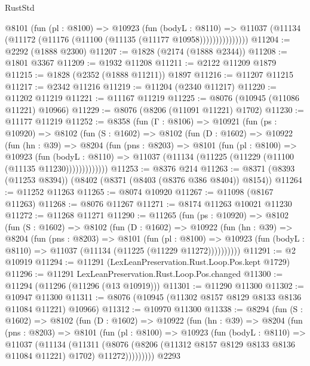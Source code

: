 \begin{lexlean}{RustStd}
\begin{coremodule}
                @8101
                  (fun (pl : @8100) =>
                  @10923
                    (fun (bodyL : @8110) =>
                    @11037 (@11134 (@11172 (@11176 (@11100 (@11135 (@11177 @10958)))))))))))))))
@11204 := @2292 (@1888 @2300)
@11207 := @1828 (@2174 (@1888 @2344))
@11208 := @1801 @3367
@11209 := @1932 @11208
@11211 := @2122 @11209 @1879
@11215 := @1828 (@2352 (@1888 @11211)) @1897
@11216 := @11207 @11215
@11217 := @2342 @11216
@11219 := @11204 (@2340 @11217)
@11220 := @11202 @11219
@11221 := @11167 @11219
@11225 := @8076 (@10945 (@11086 @11221) @10966)
@11229 := @8076 (@8206 (@11091 @11221) @1702)
@11230 := @11177 @11219
@11252 := @8358
    (fun (Γ : @8106) =>
    @10921
      (fun (ps : @10920) =>
      @8102
        (fun (S : @1602) =>
        @8102
          (fun (D : @1602) =>
          @10922
            (fun (hn : @39) =>
            @8204
              (fun (pns : @8203) =>
              @8101
                (fun (pl : @8100) =>
                @10923
                  (fun (bodyL : @8110) =>
                  @11037 (@11134 (@11225 (@11229 (@11100 (@11135 @11230)))))))))))))
@11253 := @8376 @214
@11263 := @8371 (@8393 (@11253 @8394)) (@8402 (@8371 (@8403 (@8376 @386 @8404)) @8154))
@11264 := @11252 @11263
@11265 := @8074 @10920
@11267 := @11098 (@8167 @11263)
@11268 := @8076 @11267
@11271 := @8174 @11263 @10021 @11230
@11272 := @11268 @11271
@11290 := @11265
    (fun (ps : @10920) =>
    @8102
      (fun (S : @1602) =>
      @8102
        (fun (D : @1602) =>
        @10922
          (fun (hn : @39) =>
          @8204
            (fun (pns : @8203) =>
            @8101
              (fun (pl : @8100) =>
              @10923 (fun (bodyL : @8110) => @11037 (@11134 (@11225 (@11229 @11272))))))))))
@11291 := @2 @10919
@11294 := @11291 (LexLeanPreservation.Rust.Loop.Pos.kept @1729)
@11296 := @11291 LexLeanPreservation.Rust.Loop.Pos.changed
@11300 := @11294 (@11296 (@11296 (@13 @10919)))
@11301 := @11290 @11300
@11302 := @10947 @11300
@11311 := @8076 (@10945 (@11302 @8157 @8129 @8133 @8136 @11084 @11221) @10966)
@11312 := @10970 @11300
@11338 := @8294
    (fun (S : @1602) =>
    @8102
      (fun (D : @1602) =>
      @10922
        (fun (hn : @39) =>
        @8204
          (fun (pns : @8203) =>
          @8101
            (fun (pl : @8100) =>
            @10923
              (fun (bodyL : @8110) =>
              @11037
                (@11134
                  (@11311
                    (@8076
                      (@8206 (@11312 @8157 @8129 @8133 @8136 @11084 @11221) @1702)
                      @11272)))))))))
    @2293

\end{coremodule}
\end{lexlean}
